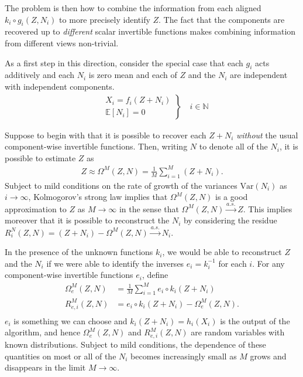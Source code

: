 The problem is then how to combine the information from each aligned ${k}_i \circ {g}_i(Z,N_i)$ to more precisely identify $Z$.
The fact that the components are recovered up to \emph{different} scalar invertible functions makes combining information from different views non-trivial.


As a first step in this direction, consider the special case that each ${g}_i$ acts additively and each $N_i$ is zero mean and each of $Z$ and the $N_i$ are independent with independent components.
\begin{align}
\left.
\begin{array}{ll}
&X_{i}={f}_{i}(Z + N_{i}) \\
&\mathbb{E}[N_i]= 0
\end{array}
\right\rbrace \quad i \in \mathbb{N}
\end{align}

Suppose to begin with that it is possible to recover each $Z + N_i$ \emph{without} the usual component-wise invertible functions. Then, writing $N$ to denote all of the $N_i$, it is possible to estimate $Z$ as
\begin{align*}
Z \approx \Omega^M(Z, N) = \frac{1}{M}\sum_{i=1}^M \left(Z + N_i\right).
\end{align*}
Subject to mild conditions on the rate of growth of the variances $\text{Var}(N_i)$ as $i\to\infty$, Kolmogorov's strong law implies that $\Omega^M(Z, N)$ is a good approximation to $Z$ as $M\to\infty$ in the sense that  $\Omega^M(Z, N) \overset{a.s.}{\longrightarrow} Z$.
This implies moreover that it is possible to reconstruct the $N_i$ by considering the residue $R^N_i(Z, N) = (Z + N_i) - \Omega^M(Z, N) \overset{a.s.}{\longrightarrow} N_i$.

In the presence of the unknown functions ${k}_i$, we would be able to reconstruct $Z$ and the $N_i$ if we were able to identify the inverses ${e}_i = {k}_i^{-1}$ for each $i$.
For any component-wise invertible functions ${e}_i$, define
\begin{align*}
\Omega_{e}^M(Z, N) &= \frac{1}{M} \sum_{i=1}^M {e}_i\circ {k}_i( Z + N_i) \\
R_{{e}, i}^M(Z, N) &= {e}_i\circ {k}_i( Z + N_i) - \Omega_{{e}}^M(Z, N).\\
\end{align*}
${e}_i$ is something we can choose and ${k}_i(Z+N_i) = {h}_i({X}_i)$ is the output of the algorithm, and hence $\Omega_{e}^M(Z, N)$ and $R_{{e}, i}^M(Z, N)$ are random variables with known distributions.
Subject to mild conditions, the dependence of these quantities on most or all of the $N_i$ becomes increasingly small as $M$ grows and disappears in the limit $M\to\infty$.


